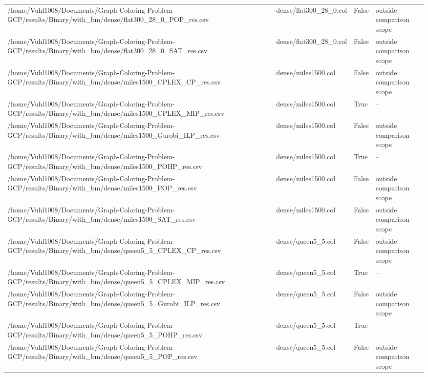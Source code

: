 \begin{table}[htbp]
\begin{tabular}{llll}
/home/Vuhl1008/Documents/Graph-Coloring-Problem-GCP/results/Binary/with\_bm/dense/flat300\_28\_0\_POP\_res.csv & dense/flat300\_28\_0.col & False & outside comparison scope \\
/home/Vuhl1008/Documents/Graph-Coloring-Problem-GCP/results/Binary/with\_bm/dense/flat300\_28\_0\_SAT\_res.csv & dense/flat300\_28\_0.col & False & outside comparison scope \\
/home/Vuhl1008/Documents/Graph-Coloring-Problem-GCP/results/Binary/with\_bm/dense/miles1500\_CPLEX\_CP\_res.csv & dense/miles1500.col & False & outside comparison scope \\
/home/Vuhl1008/Documents/Graph-Coloring-Problem-GCP/results/Binary/with\_bm/dense/miles1500\_CPLEX\_MIP\_res.csv & dense/miles1500.col & True & -- \\
/home/Vuhl1008/Documents/Graph-Coloring-Problem-GCP/results/Binary/with\_bm/dense/miles1500\_Gurobi\_ILP\_res.csv & dense/miles1500.col & False & outside comparison scope \\
/home/Vuhl1008/Documents/Graph-Coloring-Problem-GCP/results/Binary/with\_bm/dense/miles1500\_POHP\_res.csv & dense/miles1500.col & True & -- \\
/home/Vuhl1008/Documents/Graph-Coloring-Problem-GCP/results/Binary/with\_bm/dense/miles1500\_POP\_res.csv & dense/miles1500.col & False & outside comparison scope \\
/home/Vuhl1008/Documents/Graph-Coloring-Problem-GCP/results/Binary/with\_bm/dense/miles1500\_SAT\_res.csv & dense/miles1500.col & False & outside comparison scope \\
/home/Vuhl1008/Documents/Graph-Coloring-Problem-GCP/results/Binary/with\_bm/dense/queen5\_5\_CPLEX\_CP\_res.csv & dense/queen5\_5.col & False & outside comparison scope \\
/home/Vuhl1008/Documents/Graph-Coloring-Problem-GCP/results/Binary/with\_bm/dense/queen5\_5\_CPLEX\_MIP\_res.csv & dense/queen5\_5.col & True & -- \\
/home/Vuhl1008/Documents/Graph-Coloring-Problem-GCP/results/Binary/with\_bm/dense/queen5\_5\_Gurobi\_ILP\_res.csv & dense/queen5\_5.col & False & outside comparison scope \\
/home/Vuhl1008/Documents/Graph-Coloring-Problem-GCP/results/Binary/with\_bm/dense/queen5\_5\_POHP\_res.csv & dense/queen5\_5.col & True & -- \\
/home/Vuhl1008/Documents/Graph-Coloring-Problem-GCP/results/Binary/with\_bm/dense/queen5\_5\_POP\_res.csv & dense/queen5\_5.col & False & outside comparison scope \\

\end{tabular}
\end{table}

